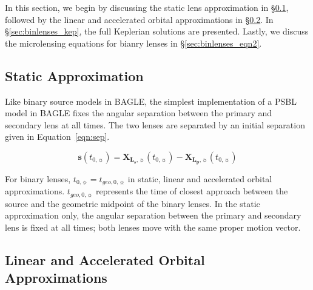 \documentclass[twocolumn]{aastex701}
\newcommand{\vect}[1]{\boldsymbol{#1}}
\newcommand{\tnot}{t_{0,\sun}}
\newcommand{\Xlpvec}{\vect{X}_{\boldsymbol{L_p},\sun}}
\newcommand{\Xlsvec}{\vect{X}_{\boldsymbol{L_s},\sun}}
\begin{document}
In this section, we begin by discussing the static lens approximation in \S\ref{sec:binlenses_static}, followed by the linear and accelerated orbital approximations in \S\ref{sec:binlenses_lin}. In \S\ref{sec:binlenses_kep}, the full Keplerian solutions are presented. Lastly, we discuss the microlensing equations for bianry lenses in \S\ref{sec:binlenses_eqn2}.

\subsection{Static Approximation}
\label{sec:binlenses_static}

Like binary source models in BAGLE, the simplest implementation of a PSBL model in BAGLE fixes the angular separation between the primary and secondary lens at all times. The two lenses are separated by an initial separation given in Equation~\ref{eqn:sep}.

\begin{equation}
    \label{eqn:sep}
    \vect{s}(\tnot) = \Xlsvec(\tnot) - \Xlpvec(\tnot)
\end{equation}

For binary lenses, $\tnot=t_{geo, 0, \sun}$ in static, linear and accelerated orbital approximations. $t_{geo, 0, \sun}$ represents the time of closest approach between the source and the geometric midpoint of the binary lenses. In the static approximation only, the angular separation between the primary and secondary lens is fixed at all times; both lenses move with the same proper motion vector. 

\subsection{Linear and Accelerated Orbital Approximations}
\label{sec:binlenses_lin}



\end{document}
